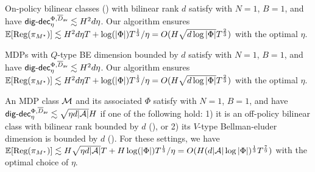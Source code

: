 \iffalse
\begin{example}
    On-policy bilinear classes () with bilinear rank $d$ satisfy  with $N=1$, $B= 1$, and have $\mathsf{dig}\text{-}\mathsf{dec}_\eta^{\Phi, \overline{D}_{\mathsf{av}}}\lesssim H^2 d\eta$. Our algorithm ensures $\mathbb{E}[\text{\rm Reg}(\pi_{M^\star})]\lesssim H^2 d\eta T + \log(|\Phi|)T^{\frac{1}{3}}/\eta = O(H\sqrt{d\log|\Phi|}T^{\frac{2}{3}})$ with the optimal $\eta$.  
\end{example}
\begin{example}
    MDPs with $Q$-type BE dimension bounded by $d$ satisfy  with $N=1$, $B= 1$, and have $\mathsf{dig}\text{-}\mathsf{dec}_\eta^{\Phi, \overline{D}_{\mathsf{av}}}\lesssim H^2 d\eta$. Our algorithm ensures $\mathbb{E}[\text{\rm Reg}(\pi_{M^\star})]\lesssim H^2 d\eta T + \log(|\Phi|)T^{\frac{1}{3}}/\eta = O(H\sqrt{d\log|\Phi|}T^{\frac{2}{3}})$ with the optimal $\eta$.  
\end{example}

\begin{example}
An MDP class $\mathcal{M}$ and its associated $\Phi$ satisfy  with $N=1$, $B=1$, and have $\mathsf{dig}\text{-}\mathsf{dec}_\eta^{\Phi, \overline{D}_{\mathsf{av}}}\lesssim \sqrt{\eta d|\mathcal{A}|}H$ if one of the following hold: 1) it is an off-policy bilinear class with bilinear rank bounded by $d$ (), or 2) its $V$-type Bellman-eluder dimension is bounded by $d$ (). For these settings, we have $\mathbb{E}[\text{\rm Reg}(\pi_{M^\star})]\lesssim H\sqrt{\eta d|\mathcal{A}|}T + H\log(|\Phi|)T^{\frac{1}{3}}/\eta=O(H(d|\mathcal{A}|\log|\Phi|)^{\frac{1}{3}}T^{\frac{7}{9}})$ with the optimal choice of $\eta$. 
\end{example}


